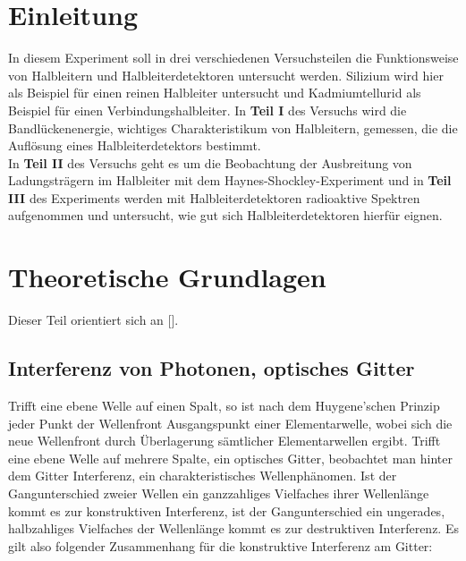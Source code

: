 \documentclass[12pt]{article}
\title{\vspace{0cm}{\Huge Fortgeschrittenen-Praktikum I:\\ \vspace{1cm}  Halbleiter}}
\author{Saskia Bondza\\Simon Stephan}
\date{Durchgeführt am 07.09.2016}
\begin{document}
\maketitle
\newpage

\thispagestyle{empty}
\tableofcontents
\newpage

\section{Einleitung}

In diesem Experiment soll in drei verschiedenen Versuchsteilen die Funktionsweise von Halbleitern und Halbleiterdetektoren untersucht werden. Silizium wird hier als Beispiel für einen reinen Halbleiter untersucht und Kadmiumtellurid als Beispiel für einen Verbindungshalbleiter.
In \textbf{Teil I} des Versuchs wird die Bandlückenenergie, wichtiges Charakteristikum von Halbleitern, gemessen, die die Auflösung eines Halbleiterdetektors bestimmt.\\
In \textbf{Teil II} des Versuchs geht es um die Beobachtung der Ausbreitung
von Ladungsträgern im Halbleiter mit dem Haynes-Shockley-Experiment und in \textbf{Teil III} des Experiments werden mit Halbleiterdetektoren radioaktive Spektren aufgenommen und untersucht, wie gut sich Halbleiterdetektoren hierfür eignen.


\newpage
\section[Theoretische Grundlagen]{Theoretische Grundlagen}

Dieser Teil orientiert sich an [].



\subsection{Interferenz von Photonen, optisches Gitter}

Trifft eine ebene Welle auf einen Spalt, so ist nach dem Huygene'schen Prinzip jeder Punkt der Wellenfront Ausgangspunkt einer Elementarwelle, wobei sich die neue Wellenfront durch Überlagerung sämtlicher Elementarwellen ergibt. Trifft eine ebene Welle auf mehrere Spalte, ein optisches Gitter, beobachtet man hinter dem Gitter Interferenz, ein charakteristisches Wellenphänomen.  Ist der Gangunterschied zweier Wellen ein ganzzahliges Vielfaches ihrer Wellenlänge kommt es zur konstruktiven Interferenz, ist der Gangunterschied ein ungerades, halbzahliges Vielfaches der Wellenlänge kommt es zur destruktiven Interferenz. Es gilt also folgender Zusammenhang für die konstruktive Interferenz am Gitter:
\end{document}
